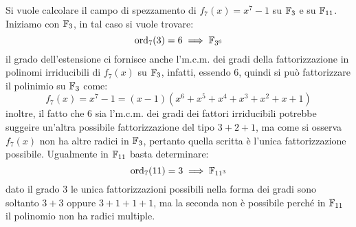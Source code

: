 \documentclass[11pt]{scrartcl}
\begin{document}
\begin{example}
	Si vuole calcolare il campo di spezzamento di $f_7(x) = x^7-1$ su $\mathbb{F}_{3}$ e su $\mathbb{F}_{11}$. Iniziamo con $\mathbb{F}_{3}$, in tal caso si vuole trovare:
		\[\operatorname{ord}_7(3) = 6 \implies \mathbb{F}_{{3}^{6}}
			\]
	il grado dell'estensione ci fornisce anche l'm.c.m. dei gradi della fattorizzazione in polinomi irriducibili di $f_7(x)$ su $\mathbb{F}_{3}$, infatti,
	essendo $6$, quindi si può fattorizzare il polinimio su $\mathbb{F}_{3}$ come:
		\[ f_7(x) = x^7 - 1 = (x-1)(x^6+x^5+x^4+x^3+x^2+x+1)
			\]
	inoltre, il fatto che 6 sia l'm.c.m. dei gradi dei fattori irriducibili potrebbe suggeire un'altra possibile fattorizzazione del tipo $3+2+1$, ma
	come si osserva $f_7(x)$ non ha altre radici in $\mathbb{F}_{3}$, pertanto quella scritta è l'unica fattorizzazione possibile. Ugualmente in $\mathbb{F}_{11}$ basta determinare:
		\[\operatorname{ord}_7(11) = 3 \implies \mathbb{F}_{{11}^{3}}
			\]
		dato il grado $3$ le unica fattorizzazioni possibili nella forma dei gradi sono soltanto $3+3$ oppure $3+1+1+1$, ma la seconda non è
		possibile perché in $\mathbb{F}_{11}$ il polinomio non ha radici multiple.
\end{example}
\end{document}
